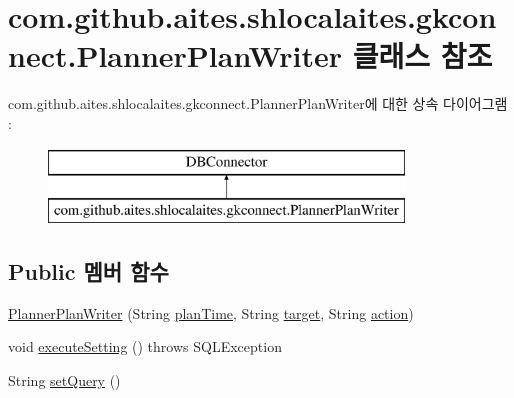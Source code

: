 \hypertarget{classcom_1_1github_1_1aites_1_1shlocalaites_1_1gkconnect_1_1_planner_plan_writer}{}\section{com.\+github.\+aites.\+shlocalaites.\+gkconnect.\+Planner\+Plan\+Writer 클래스 참조}
\label{classcom_1_1github_1_1aites_1_1shlocalaites_1_1gkconnect_1_1_planner_plan_writer}
com.\+github.\+aites.\+shlocalaites.\+gkconnect.\+Planner\+Plan\+Writer에 대한 상속 다이어그램 \+: \begin{figure}[H]
\begin{center}
\leavevmode
\includegraphics[height=2.000000cm]{classcom_1_1github_1_1aites_1_1shlocalaites_1_1gkconnect_1_1_planner_plan_writer}
\end{center}
\end{figure}
\subsection*{Public 멤버 함수}
\begin{DoxyCompactItemize}
\item 
\mbox{\hyperlink{classcom_1_1github_1_1aites_1_1shlocalaites_1_1gkconnect_1_1_planner_plan_writer_a60dc78ce38bec83af5ebdbca1f1a21e0}{Planner\+Plan\+Writer}} (String \mbox{\hyperlink{classcom_1_1github_1_1aites_1_1shlocalaites_1_1gkconnect_1_1_planner_plan_writer_ad6cb43e87aa18f5f2a27f8adb848ba3e}{plan\+Time}}, String \mbox{\hyperlink{classcom_1_1github_1_1aites_1_1shlocalaites_1_1gkconnect_1_1_planner_plan_writer_aba8faa2341be4a8571453df2ee7144ab}{target}}, String \mbox{\hyperlink{classcom_1_1github_1_1aites_1_1shlocalaites_1_1gkconnect_1_1_planner_plan_writer_ac126c52b58b3cca2aa2189e0a2d42979}{action}})
\item 
void \mbox{\hyperlink{classcom_1_1github_1_1aites_1_1shlocalaites_1_1gkconnect_1_1_planner_plan_writer_ae6d4ec4f52caf8f52c1d4ef28798c70f}{execute\+Setting}} ()  throws S\+Q\+L\+Exception 
\item 
String \mbox{\hyperlink{classcom_1_1github_1_1aites_1_1shlocalaites_1_1gkconnect_1_1_planner_plan_writer_a3cf7f937df3c71df97ada4574b4a01f9}{set\+Query}} ()
\end{DoxyCompactItemize}

